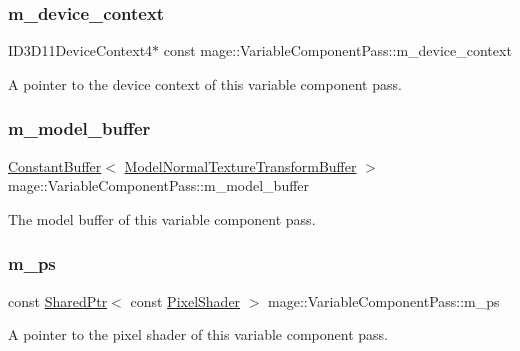 \subsubsection{\texorpdfstring{m\+\_\+device\+\_\+context}{m\_device\_context}}
{\footnotesize\ttfamily I\+D3\+D11\+Device\+Context4$\ast$ const mage\+::\+Variable\+Component\+Pass\+::m\+\_\+device\+\_\+context\hspace{0.3cm}{\ttfamily [private]}}

A pointer to the device context of this variable component pass. \hypertarget{classmage_1_1_variable_component_pass_a2ddb72a3c1464e7ab0f788df25ae733a}{}\label{classmage_1_1_variable_component_pass_a2ddb72a3c1464e7ab0f788df25ae733a} 
\subsubsection{\texorpdfstring{m\+\_\+model\+\_\+buffer}{m\_model\_buffer}}
{\footnotesize\ttfamily \hyperlink{structmage_1_1_constant_buffer}{Constant\+Buffer}$<$ \hyperlink{structmage_1_1_model_normal_texture_transform_buffer}{Model\+Normal\+Texture\+Transform\+Buffer} $>$ mage\+::\+Variable\+Component\+Pass\+::m\+\_\+model\+\_\+buffer\hspace{0.3cm}{\ttfamily [private]}}

The model buffer of this variable component pass. \hypertarget{classmage_1_1_variable_component_pass_a005eac17e55f81d3bc8b5989400ed087}{}\label{classmage_1_1_variable_component_pass_a005eac17e55f81d3bc8b5989400ed087} 
\subsubsection{\texorpdfstring{m\+\_\+ps}{m\_ps}}
{\footnotesize\ttfamily const \hyperlink{namespacemage_a1e01ae66713838a7a67d30e44c67703e}{Shared\+Ptr}$<$ const \hyperlink{namespacemage_a27ecaf266420ee7a494d64edc0757129}{Pixel\+Shader} $>$ mage\+::\+Variable\+Component\+Pass\+::m\+\_\+ps\hspace{0.3cm}{\ttfamily [private]}}

A pointer to the pixel shader of this variable component pass. \hypertarget{classmage_1_1_variable_component_pass_a6e9a67c5251951f887d64c1a6d50a33c}{}\label{classmage_1_1_variable_component_pass_a6e9a67c5251951f887d64c1a6d50a33c} 
